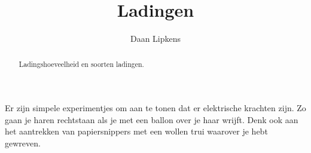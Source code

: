 \documentclass{ximera}
\title{Ladingen}
\author{Daan Lipkens}
\begin{document}
\begin{abstract}
    Ladingshoeveelheid en soorten ladingen.
\end{abstract}
\maketitle

Er zijn simpele experimentjes om aan te tonen dat er elektrische krachten zijn. Zo gaan je haren rechtstaan als je met een ballon over je haar wrijft. Denk ook aan het aantrekken van papiersnippers met een wollen trui waarover je hebt gewreven.


\end{document}
